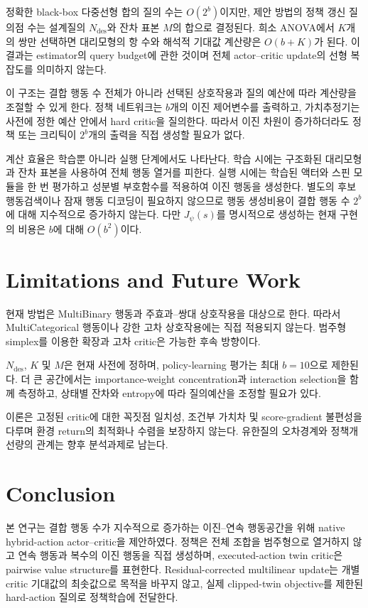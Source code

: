 \documentclass[10pt,journal]{IEEEtran}
\begin{document}
정확한 black-box 다중선형 합의 질의 수는 $O(2^b)$이지만, 제안 방법의 정책 갱신 질의점 수는 설계질의 $N_{\mathrm{des}}$와 잔차 표본 $M$의 합으로 결정된다. 희소 ANOVA에서 $K$개의 쌍만 선택하면 대리모형의 항 수와 해석적 기대값 계산량은 $O(b+K)$가 된다. 이 결과는 estimator의 query budget에 관한 것이며 전체 actor--critic update의 선형 복잡도를 의미하지 않는다.

이 구조는 결합 행동 수 전체가 아니라 선택된 상호작용과 질의 예산에 따라 계산량을 조절할 수 있게 한다. 정책 네트워크는 $b$개의 이진 제어변수를 출력하고, 가치추정기는 사전에 정한 예산 안에서 hard critic을 질의한다. 따라서 이진 차원이 증가하더라도 정책 또는 크리틱이 $2^b$개의 출력을 직접 생성할 필요가 없다.

계산 효율은 학습뿐 아니라 실행 단계에서도 나타난다. 학습 시에는 구조화된 대리모형과 잔차 표본을 사용하여 전체 행동 열거를 피한다. 실행 시에는 학습된 액터와 스핀 모듈을 한 번 평가하고 성분별 부호함수를 적용하여 이진 행동을 생성한다. 별도의 후보 행동검색이나 잠재 행동 디코딩이 필요하지 않으므로 행동 생성비용이 결합 행동 수 $2^b$에 대해 지수적으로 증가하지 않는다. 다만 $J_\psi(s)$를 명시적으로 생성하는 현재 구현의 비용은 $b$에 대해 $O(b^2)$이다.


\section{Limitations and Future Work}
\label{sec:limitations}

현재 방법은 MultiBinary 행동과 주효과--쌍대 상호작용을 대상으로 한다. 따라서 MultiCategorical 행동이나 강한 고차 상호작용에는 직접 적용되지 않는다. 범주형 simplex를 이용한 확장과 고차 critic은 가능한 후속 방향이다.

$N_{\mathrm{des}}$, $K$ 및 $M$은 현재 사전에 정하며, policy-learning 평가는 최대 $b=10$으로 제한된다. 더 큰 공간에서는 importance-weight concentration과 interaction selection을 함께 측정하고, 상태별 잔차와 entropy에 따라 질의예산을 조정할 필요가 있다.

이론은 고정된 critic에 대한 꼭짓점 일치성, 조건부 가치차 및 score-gradient 불편성을 다루며 환경 return의 최적화나 수렴을 보장하지 않는다. 유한질의 오차경계와 정책개선량의 관계는 향후 분석과제로 남는다.


\section{Conclusion}
\label{sec:conclusion}

본 연구는 결합 행동 수가 지수적으로 증가하는 이진--연속 행동공간을 위해 native hybrid-action actor--critic을 제안하였다. 정책은 전체 조합을 범주형으로 열거하지 않고 연속 행동과 복수의 이진 행동을 직접 생성하며, executed-action twin critic은 pairwise value structure를 표현한다. Residual-corrected multilinear update는 개별 critic 기대값의 최솟값으로 목적을 바꾸지 않고, 실제 clipped-twin objective를 제한된 hard-action 질의로 정책학습에 전달한다.
\end{document}
